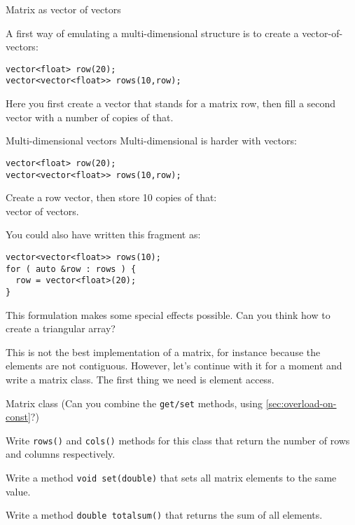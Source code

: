  {Matrix as vector of vectors}

A first way of emulating a multi-dimensional structure
is to create a vector-of-vectors:
\begin{lstlisting}
vector<float> row(20);
vector<vector<float>> rows(10,row);
\end{lstlisting}
Here you first create a vector that stands for a matrix row,
then fill a second vector with a number of copies of that.

\begin{slide}{Multi-dimensional vectors}
  \label{sl:multi-vector}
  Multi-dimensional is harder with vectors:
\begin{lstlisting}
vector<float> row(20);
vector<vector<float>> rows(10,row);
\end{lstlisting}
Create a row vector, then store 10 copies of that:\\
vector of vectors.
\end{slide}

\begin{remark}
You could also have written this fragment as:
\begin{lstlisting}
vector<vector<float>> rows(10);
for ( auto &row : rows ) {
  row = vector<float>(20);
}
\end{lstlisting}
This formulation makes some special effects possible.
Can you think how to create a triangular array?
\end{remark}

This is not the best implementation of a matrix, for instance because
the elements are not contiguous.
However, let's continue with it for a moment and write a matrix class.
The first thing we need is element access.

\begin{block}{Matrix class}
  \label{sl:matrix-class}
  \lstset{style=snippetcode}
  (Can you combine the \lstinline{get/set} methods, using
  \ref{sec:overload-on-const}?)
\end{block}

\begin{exercise}
  \label{ex:matrixclass-rowcol1}
  Write \lstinline+rows()+ and \lstinline+cols()+ methods for this class that return
  the number of rows and columns respectively.
\end{exercise}

\begin{exercise}
  \label{ex:matrix-set-sum}
  Write a method \lstinline+void set(double)+ that sets all
  matrix elements to the same value.

  Write a method \lstinline+double totalsum()+ that returns
  the sum of all elements.
\end{exercise}


